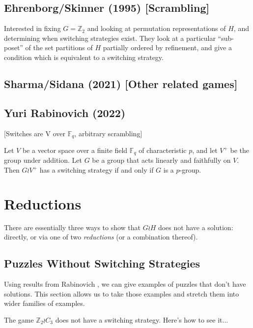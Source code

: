 \subsection{Ehrenborg/Skinner (1995) [Scrambling]}
\begin{theorem}
Interested in fixing $G = \mathbb Z_2$ and looking at permutation
representations of $H$, and determining when switching strategies exist.
They look at a particular ``sub-poset'' of the set partitions of $H$ partially
ordered by refinement, and give a condition which is equivalent to a switching
strategy.
\end{theorem}
\subsection{Sharma/Sidana (2021) [Other related games]}
\subsection{Yuri Rabinovich (2022)}
[Switches are V over $\mathbb F_q$, arbitrary scrambling]

\begin{theorem}
  Let $V$ be a vector space over a finite field $\mathbb F_q$ of characteristic
  $p$, and let $V^+$ be the group under addition.
  Let $G$ be a group that acts linearly and faithfully on $V$.
  Then $G \wr V^+$ has a switching strategy if and only if $G$ is a $p$-group.
\end{theorem}
\section{Reductions}
\label{sec:Reductions}
There are essentially three ways to show that $G \wr H$ does not have a
solution: directly, or via one of two \textit{reductions} (or a combination thereof).

\subsection{Puzzles Without Switching Strategies}
Using results from Rabinovich \cite{Rabinovich2022}, we can give examples of
puzzles that don't have solutions. This section allows us to take those examples
and stretch them into wider families of examples.

\begin{example}
  The game $\mathbb Z_2 \wr C_3$ does not have a switching strategy. Here's how to see it...
  \label{ex:NoSolutionZ2C3}
\end{example}

